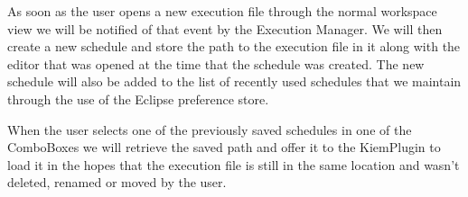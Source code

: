 As soon as the user opens a new execution file through the normal workspace
view we will be notified of that event by the Execution Manager. We will then create a new
schedule and store the path to the execution file in it along with the editor
that was opened at the time that the schedule was created. The new schedule will
also be added to the list of recently used schedules that we maintain through the 
use of the Eclipse preference store.

When the user selects one of the previously saved schedules in one of the
ComboBoxes we will retrieve the saved path and offer it to the KiemPlugin to
load it in the hopes that the execution file is still in the same location and
wasn't deleted, renamed or moved by the user.
